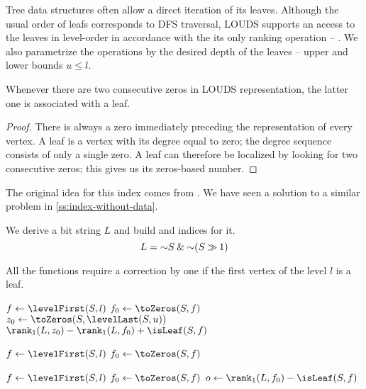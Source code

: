 Tree data structures often allow a direct iteration of its leaves.
Although the usual order of leafs corresponds to DFS traversal, LOUDS supports an access to the leaves in level-order in accordance with the its only ranking operation -- \inRank{}.
We also parametrize the operations by the desired depth of the leaves -- upper and lower bounds $u \le l$.

\begin{lemma}
	Whenever there are two consecutive zeros in LOUDS representation, the latter one is associated with a leaf.
\end{lemma}
\begin{proof}
	There is always a zero immediately preceding the representation of every vertex.
	A leaf is a vertex with its degree equal to zero; the degree sequence consists of only a single zero.
	A leaf can therefore be localized by looking for two consecutive zeros; this gives us its zeros-based number.
\end{proof}

The original idea for this index comes from \cite{munro1998space}.
We have seen a solution to a similar problem in \ref{ss:index-without-data}.

We derive a bit string $L$ and build \rank{} and \select{} indices for it.
$$L = \mathord{\sim} S \mathbin{\&} \mathord{\sim} (S \mathbin{\gg} 1)$$

All the functions require a correction by one if the first vertex of the level $l$ is a leaf.

\begin{algorithmic}
	\State $f \gets \levelFirst(S, l)$ 
	\State $f_0 \gets \toZeros(S, f)$
	\State $z_0 \gets \toZeros(S, \levelLast(S, u))$
	\State \Return $\rank_1(L, z_0) - \rank_1(L, f_0) + \isLeaf(S, f)$
\EndFunction
\end{algorithmic}

\begin{algorithmic}	
 
	\State $f \gets \levelFirst(S, l)$ 
	\State $f_0 \gets \toZeros(S, f)$
	\State {}
\EndFunction
\end{algorithmic}

\begin{algorithmic}
	\State $f \gets \levelFirst(S, l)$ 
	\State $f_0 \gets \toZeros(S, f)$
	\State $o \gets \rank_1(L, f_0) - \isLeaf(S, f)$ 
	\State {}
\EndFunction
\end{algorithmic}

